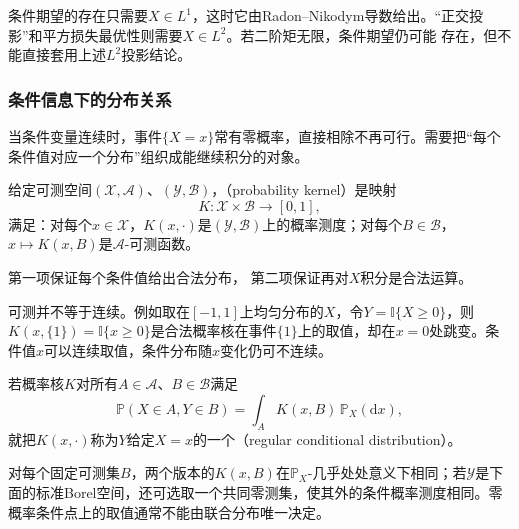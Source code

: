 条件期望的存在只需要\(X\in L^1\)，这时它由Radon--Nikodym导数给出。“正交投影”和平方损失最优性则需要\(X\in L^2\)。若二阶矩无限，条件期望仍可能
存在，但不能直接套用上述\(L^2\)投影结论。

\subsubsection{条件信息下的分布关系}
\label{sec:rv-conditional-distribution}
当条件变量连续时，事件\(\{X=x\}\)常有零概率，直接相除不再可行。需要把“每个条件值对应一个分布”组织成能继续积分的对象。
\begin{definition}[概率核]
  \label{def:probability-kernel}
  给定可测空间\((\mathcal X,\mathcal A)\)、\((\mathcal Y,\mathcal B)\)，（probability kernel）是映射
  \[ K:\mathcal X\times\mathcal B\to[0,1], \]
  满足：对每个\(x\in\mathcal X\)，\(K(x,\cdot)\)是\((\mathcal Y,\mathcal B)\)上的概率测度；对每个\(B\in\mathcal B\)，\(x\mapsto K(x,B)\)是\(\mathcal A\)-可测函数。
\end{definition}
第一项保证每个条件值给出合法分布，
第二项保证再对\(X\)积分是合法运算。

可测并不等于连续。例如取在\([-1,1]\)上均匀分布的\(X\)，令\(Y=\mathbb I\{X\geq0\}\)，则\(K(x,\{1\})=\mathbb I\{x\geq0\}\)是合法概率核在事件\(\{1\}\)上的取值，却在\(x=0\)处跳变。条件值\(x\)可以连续取值，条件分布随\(x\)变化仍可不连续。

\begin{definition}[正则条件分布]
  \label{def:probability-regular-conditional-distribution}
若概率核\(K\)对所有\(A\in\mathcal A\)、\(B\in\mathcal B\)满足
\begin{equation}
  \mathbb{P}(X\in A,Y\in B)
  =
  \int_A K(x,B)\,\mathbb{P}_X(\mathrm{d}x),
  \label{eq:probability-regular-conditional-kernel}
\end{equation}
就把\(K(x,\cdot)\)称为\(Y\)给定\(X=x\)的一个（regular conditional distribution）。
\end{definition}
对每个固定可测集\(B\)，两个版本的\(K(x,B)\)在\(\mathbb P_X\)-几乎处处意义下相同；若\(\mathcal Y\)是下面的标准Borel空间，还可选取一个共同零测集，使其外的条件概率测度相同。零概率条件点上的取值通常不能由联合分布唯一决定。

